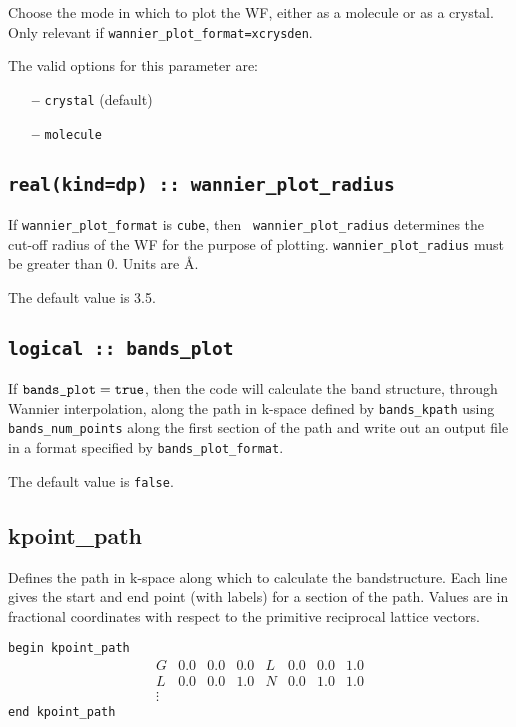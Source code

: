 Choose the mode in which to plot the WF, either as a molecule
or as a crystal. Only relevant if {\tt wannier\_plot\_format=xcrysden}. 

The valid options for this parameter are:
\begin{itemize}
\item[{\bf --}] \verb#crystal# (default)
\item[{\bf --}] \verb#molecule# 
\end{itemize}


\subsection[wannier\_plot\_radius]{\tt real(kind=dp) ::
  wannier\_plot\_radius}

If {\tt wannier\_plot\_format} is {\tt cube}, then {\tt
  wannier\_plot\_radius} determines the cut-off radius of the WF for
  the purpose of plotting. {\tt wannier\_plot\_radius} must be greater than
  0. Units are \AA.

The default value is 3.5. 

\subsection[bands\_plot]{\tt logical :: bands\_plot}

If $\verb#bands_plot#=\verb#true#$, then the code will calculate the band
structure, through Wannier interpolation,
 along
the path in k-space defined by \verb#bands_kpath# using \verb#bands_num_points# along the first
section of the path and write out an output file in a format specified
by \verb#bands_plot_format#. 

The default value is \verb#false#.


\subsection[kpoint\_path]{kpoint\_path}
Defines the path in k-space along which to calculate the
bandstructure. Each line gives the start and end point (with labels)
for a section of the path. Values are in fractional coordinates with
respect to the primitive reciprocal lattice vectors.

\noindent  \verb#begin kpoint_path#
$$
\begin{array}{cccccccc}
G & 0.0 & 0.0 & 0.0 & L & 0.0 & 0.0 & 1.0 \\
L & 0.0 & 0.0 & 1.0 & N & 0.0 & 1.0 & 1.0 \\
\vdots
\end{array}
$$
\verb#end kpoint_path#



